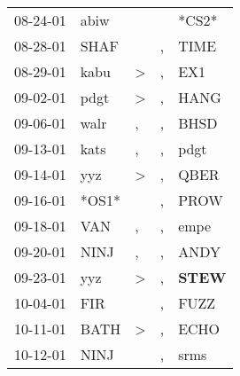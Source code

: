 \begin{supertabular}{p{0.07\textwidth}p{0.06\textwidth}p{0.02\textwidth}p{0.02\textwidth}p{0.06\textwidth}}
          08-24-01\textsuperscript{} &           abiw\textsuperscript{} &                  &                  &                            *CS2* \\
          08-28-01\textsuperscript{} &           SHAF\textsuperscript{} &                  &                , &           TIME\textsuperscript{} \\
          08-29-01\textsuperscript{} &           kabu\textsuperscript{} &     \textgreater &                , &            EX1\textsuperscript{} \\
          09-02-01\textsuperscript{} &           pdgt\textsuperscript{} &     \textgreater &                , &           HANG\textsuperscript{} \\
          09-06-01\textsuperscript{} &           walr\textsuperscript{} &                , &                , &           BHSD\textsuperscript{} \\
          09-13-01\textsuperscript{} &           kats\textsuperscript{} &                , &                , &           pdgt\textsuperscript{} \\
          09-14-01\textsuperscript{} &            yyz\textsuperscript{} &     \textgreater &                , &           QBER\textsuperscript{} \\
          09-16-01\textsuperscript{} &                            *OS1* &                  &                , &           PROW\textsuperscript{} \\
          09-18-01\textsuperscript{} &            VAN\textsuperscript{} &                , &                , &           empe\textsuperscript{} \\
          09-20-01\textsuperscript{} &           NINJ\textsuperscript{} &                , &                , &           ANDY\textsuperscript{} \\
          09-23-01\textsuperscript{} &            yyz\textsuperscript{} &     \textgreater &                , &  \textbf{STEW\textsuperscript{}} \\
          10-04-01\textsuperscript{} &            FIR\textsuperscript{} &                  &                , &           FUZZ\textsuperscript{} \\
          10-11-01\textsuperscript{} &           BATH\textsuperscript{} &     \textgreater &                , &           ECHO\textsuperscript{} \\
          10-12-01\textsuperscript{} &           NINJ\textsuperscript{} &                  &                , &           srms\textsuperscript{} \\

\end{supertabular}
